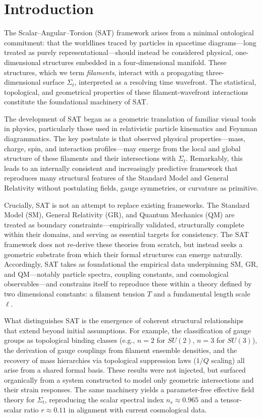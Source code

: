 \documentclass[12pt]{article}
\begin{document}
\section*{Introduction}

The Scalar--Angular--Torsion (SAT) framework arises from a minimal ontological commitment: that the worldlines traced by particles in spacetime diagrams---long treated as purely representational---should instead be considered physical, one-dimensional structures embedded in a four-dimensional manifold. These structures, which we term \emph{filaments}, interact with a propagating three-dimensional surface $\Sigma_t$, interpreted as a resolving time wavefront. The statistical, topological, and geometrical properties of these filament-wavefront interactions constitute the foundational machinery of SAT.

The development of SAT began as a geometric translation of familiar visual tools in physics, particularly those used in relativistic particle kinematics and Feynman diagrammatics. The key postulate is that observed physical properties---mass, charge, spin, and interaction profiles---may emerge from the local and global structure of these filaments and their intersections with $\Sigma_t$. Remarkably, this leads to an internally consistent and increasingly predictive framework that reproduces many structural features of the Standard Model and General Relativity without postulating fields, gauge symmetries, or curvature as primitive.

Crucially, SAT is not an attempt to replace existing frameworks. The Standard Model (SM), General Relativity (GR), and Quantum Mechanics (QM) are treated as boundary constraints---empirically validated, structurally complete within their domains, and serving as essential targets for consistency. The SAT framework does not re-derive these theories from scratch, but instead seeks a geometric substrate from which their formal structures can emerge naturally. Accordingly, SAT takes as foundational the empirical data underpinning SM, GR, and QM---notably particle spectra, coupling constants, and cosmological observables---and constrains itself to reproduce these within a theory defined by two dimensional constants: a filament tension $T$ and a fundamental length scale $\ell$.

What distinguishes SAT is the emergence of coherent structural relationships that extend beyond initial assumptions. For example, the classification of gauge groups as topological binding classes (e.g., $n=2$ for $SU(2)$, $n=3$ for $SU(3)$), the derivation of gauge couplings from filament ensemble densities, and the recovery of mass hierarchies via topological suppression laws ($1/Q$ scaling) all arise from a shared formal basis. These results were not injected, but surfaced organically from a system constructed to model only geometric intersections and their strain responses. The same machinery yields a parameter-free effective field theory for $\Sigma_t$, reproducing the scalar spectral index $n_s \approx 0.965$ and a tensor-scalar ratio $r \approx 0.11$ in alignment with current cosmological data.
\end{document}
